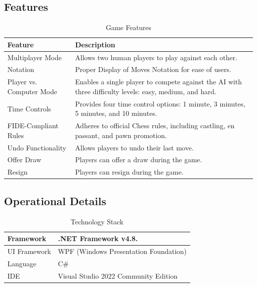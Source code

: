 \documentclass[a4paper,12pt]{article}
\begin{document}
\subsection{Features}
\begin{longtable}{|p{}|p{}|}
    \caption{Game Features}
    \hline
    \textbf{Feature} & \textbf{Description} \\
    \hline
    Multiplayer Mode & Allows two human players to play against each other. \\
    \hline
    Notation & Proper Display of Moves Notation for ease of users. \\
    \hline
    Player vs. Computer Mode & Enables a single player to compete against the AI with three difficulty levels: easy, medium, and hard. \\
    \hline
    Time Controls & Provides four time control options: 1 minute, 3 minutes, 5 minutes, and 10 minutes. \\
    \hline
    FIDE-Compliant Rules & Adheres to official Chess rules, including castling, en passant, and pawn promotion. \\
    \hline
    Undo Functionality & Allows players to undo their last move. \\
    \hline
    Offer Draw & Players can offer a draw during the game. \\
    \hline
    Resign & Players can resign during the game. \\
    \hline
\end{longtable}

\subsection{Operational Details}
\begin{longtable}{|p{}|p{}|}
    \caption{Technology Stack}
    \hline
    Framework & .NET Framework v4.8. \\
    \hline
    UI Framework & WPF (Windows Presentation Foundation)   \\
    \hline
    Language & C\# \\
    \hline
    IDE & Visual Studio 2022 Community Edition \\
    \hline
\end{longtable}
\end{document}

